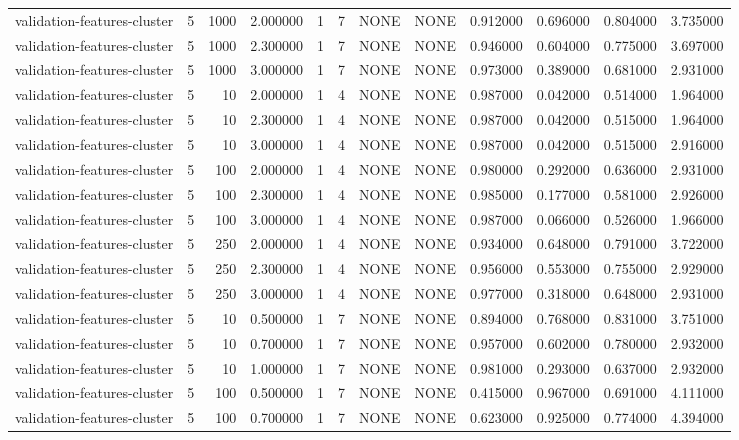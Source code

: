 \begin{tabular}{lrrrllllrrrr}
validation-features-cluster & 5 & 1000 & 2.000000 & 1 & 7 & NONE & NONE & 0.912000 & 0.696000 & 0.804000 & 3.735000 \\
validation-features-cluster & 5 & 1000 & 2.300000 & 1 & 7 & NONE & NONE & 0.946000 & 0.604000 & 0.775000 & 3.697000 \\
validation-features-cluster & 5 & 1000 & 3.000000 & 1 & 7 & NONE & NONE & 0.973000 & 0.389000 & 0.681000 & 2.931000 \\
validation-features-cluster & 5 & 10 & 2.000000 & 1 & 4 & NONE & NONE & 0.987000 & 0.042000 & 0.514000 & 1.964000 \\
validation-features-cluster & 5 & 10 & 2.300000 & 1 & 4 & NONE & NONE & 0.987000 & 0.042000 & 0.515000 & 1.964000 \\
validation-features-cluster & 5 & 10 & 3.000000 & 1 & 4 & NONE & NONE & 0.987000 & 0.042000 & 0.515000 & 2.916000 \\
validation-features-cluster & 5 & 100 & 2.000000 & 1 & 4 & NONE & NONE & 0.980000 & 0.292000 & 0.636000 & 2.931000 \\
validation-features-cluster & 5 & 100 & 2.300000 & 1 & 4 & NONE & NONE & 0.985000 & 0.177000 & 0.581000 & 2.926000 \\
validation-features-cluster & 5 & 100 & 3.000000 & 1 & 4 & NONE & NONE & 0.987000 & 0.066000 & 0.526000 & 1.966000 \\
validation-features-cluster & 5 & 250 & 2.000000 & 1 & 4 & NONE & NONE & 0.934000 & 0.648000 & 0.791000 & 3.722000 \\
validation-features-cluster & 5 & 250 & 2.300000 & 1 & 4 & NONE & NONE & 0.956000 & 0.553000 & 0.755000 & 2.929000 \\
validation-features-cluster & 5 & 250 & 3.000000 & 1 & 4 & NONE & NONE & 0.977000 & 0.318000 & 0.648000 & 2.931000 \\
validation-features-cluster & 5 & 10 & 0.500000 & 1 & 7 & NONE & NONE & 0.894000 & 0.768000 & 0.831000 & 3.751000 \\
validation-features-cluster & 5 & 10 & 0.700000 & 1 & 7 & NONE & NONE & 0.957000 & 0.602000 & 0.780000 & 2.932000 \\
validation-features-cluster & 5 & 10 & 1.000000 & 1 & 7 & NONE & NONE & 0.981000 & 0.293000 & 0.637000 & 2.932000 \\
validation-features-cluster & 5 & 100 & 0.500000 & 1 & 7 & NONE & NONE & 0.415000 & 0.967000 & 0.691000 & 4.111000 \\
validation-features-cluster & 5 & 100 & 0.700000 & 1 & 7 & NONE & NONE & 0.623000 & 0.925000 & 0.774000 & 4.394000 \\

\end{tabular}
